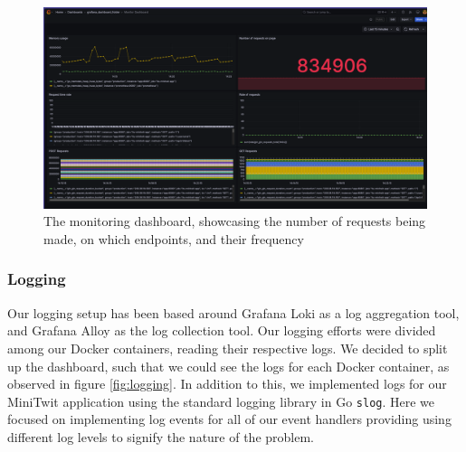 \begin{figure} [H]
    \centering
    \includegraphics[width=1\linewidth]{images/Monitor.png}
    \caption{The monitoring dashboard, showcasing the number of requests being made, on which endpoints, and their frequency}
    \label{fig:monitor}
\end{figure}

\subsubsection{Logging}
Our logging setup has been based around Grafana Loki as a log aggregation tool, and Grafana Alloy as the log collection tool. Our logging efforts were divided among our Docker containers, reading their respective logs. We decided to split up the dashboard, such that we could see the logs for each Docker container, as observed in figure \ref{fig:logging}. In addition to this, we implemented logs for our MiniTwit application using the standard logging library in Go \texttt{slog}. Here we focused on implementing log events for all of our event handlers providing using different log levels to signify the nature of the problem.

